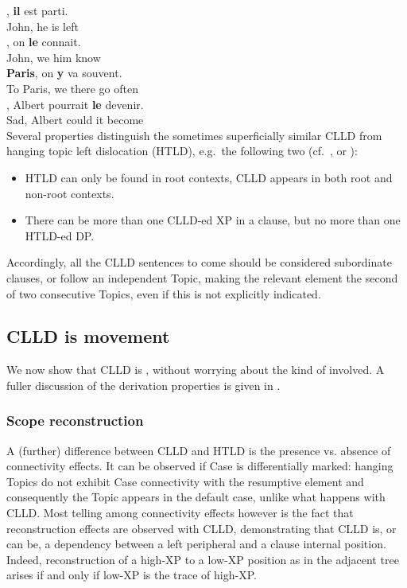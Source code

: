 \documentclass[output=paper]{langsci/langscibook}
\begin{document}
\ea
\ea
	, {\bf il} est parti.\\
John, he is left\\
\ex
	, on  {\bf le} connait.\\
John, we him know\\
\ex
	 {\bf Paris}, on  {\bf y} va souvent.\\
To Paris, we there go often\\
\ex
	, Albert pourrait {\bf le} devenir.\label{predle}\\
Sad, Albert could it become \\
\z
\z
%
Several properties distinguish the sometimes superficially similar
\gls{CLLD} from hanging topic left dislocation
(HTLD), e.g.\ the following two (cf.\ \citealp{AlexiadouLD}, or
\citealp{Krapova2008}):

\begin{itemize}
\item HTLD can only be found in root contexts, \gls{CLLD} appears in both root and non-root contexts.
\item There can be more than one \gls{CLLD}-ed XP in a clause, but no more than one HTLD-ed DP.
\end{itemize}
Accordingly, all the \gls{CLLD} sentences to come
should be considered subordinate clauses, or follow an independent Topic,
making the relevant element the second of two consecutive Topics, even if this
is not explicitly indicated.

\subsection{CLLD is movement}

We now show that \gls{CLLD} is , without
worrying about the kind of  involved. A fuller discussion of the
derivation properties is given in \citet{Angelopoulo2017}.

\subsubsection{Scope reconstruction}

A (further) difference between \gls{CLLD} and HTLD
is the presence vs. absence of connectivity effects. It can be observed if Case
is differentially marked: hanging Topics do not exhibit Case connectivity with
the resumptive element and consequently the Topic appears in the default case,
unlike what happens with CLLD. Most telling among connectivity effects however
is the fact that reconstruction effects are observed with CLLD,  demonstrating
that \gls{CLLD} is, or can be, a 
dependency between a left peripheral and a clause internal position.
Indeed, reconstruction of a high-XP  to a low-XP position as in the adjacent
tree arises if and only if  low-XP is the trace of  high-XP.
\end{document}
